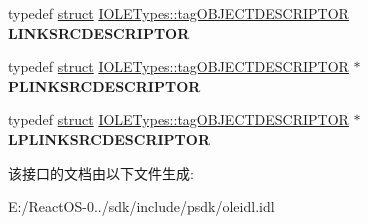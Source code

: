 \begin{DoxyCompactItemize}
typedef \hyperlink{interfacestruct}{struct} \hyperlink{struct_i_o_l_e_types_1_1tag_o_b_j_e_c_t_d_e_s_c_r_i_p_t_o_r}{I\+O\+L\+E\+Types\+::tag\+O\+B\+J\+E\+C\+T\+D\+E\+S\+C\+R\+I\+P\+T\+OR} {\bfseries L\+I\+N\+K\+S\+R\+C\+D\+E\+S\+C\+R\+I\+P\+T\+OR}
\item 
\mbox{\label{interface_i_o_l_e_types_a0120845dacf15ceb5dc69975ec0b7ce5}} 
typedef \hyperlink{interfacestruct}{struct} \hyperlink{struct_i_o_l_e_types_1_1tag_o_b_j_e_c_t_d_e_s_c_r_i_p_t_o_r}{I\+O\+L\+E\+Types\+::tag\+O\+B\+J\+E\+C\+T\+D\+E\+S\+C\+R\+I\+P\+T\+OR} $\ast$ {\bfseries P\+L\+I\+N\+K\+S\+R\+C\+D\+E\+S\+C\+R\+I\+P\+T\+OR}
\item 
\mbox{\label{interface_i_o_l_e_types_a1beba6be59446bf9f2abac53c90b858c}} 
typedef \hyperlink{interfacestruct}{struct} \hyperlink{struct_i_o_l_e_types_1_1tag_o_b_j_e_c_t_d_e_s_c_r_i_p_t_o_r}{I\+O\+L\+E\+Types\+::tag\+O\+B\+J\+E\+C\+T\+D\+E\+S\+C\+R\+I\+P\+T\+OR} $\ast$ {\bfseries L\+P\+L\+I\+N\+K\+S\+R\+C\+D\+E\+S\+C\+R\+I\+P\+T\+OR}
\end{DoxyCompactItemize}


该接口的文档由以下文件生成\+:\begin{DoxyCompactItemize}
\item 
E\+:/\+React\+O\+S-\/0../sdk/include/psdk/oleidl.\+idl\end{DoxyCompactItemize}

